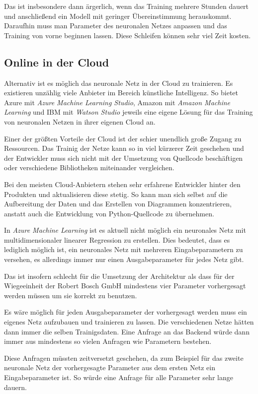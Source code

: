 Das ist insbesondere dann ärgerlich, wenn das Training mehrere Stunden dauert und anschließend ein Modell mit geringer
Übereinstimmung herauskommt. Daraufhin muss man Parameter des neuronalen Netzes anpassen und das Training von vorne
beginnen lassen. Diese Schleifen können sehr viel Zeit kosten.

\subsection{Online in der Cloud}
Alternativ ist es möglich das neuronale Netz in der Cloud zu trainieren. Es existieren unzählig viele Anbieter im
Bereich künstliche Intelligenz. So bietet Azure mit \textit{Azure Machine Learning Studio}, Amazon mit
\textit{Amazon Machine Learning} und IBM mit \textit{Watson Studio} jeweils eine eigene Lösung für das Training von
neuronalen Netzen in ihrer eigenen Cloud an.

Einer der größten Vorteile der Cloud ist der schier unendlich große Zugang zu Ressourcen. Das Trainig der Netze kann so
in viel kürzerer Zeit geschehen und der Entwickler muss sich nicht mit der Umsetzung von Quellcode beschäftigen oder
verschiedene Bibliotheken miteinander vergleichen.

Bei den meisten Cloud-Anbietern stehen sehr erfahrene Entwickler hinter den Produkten und aktualisieren diese stetig. So
kann man sich selbst auf die Aufbereitung der Daten und das Erstellen von Diagrammen konzentrieren, anstatt auch die
Entwicklung von Python-Quellcode zu übernehmen.

In \textit{Azure Machine Learning} ist es aktuell nicht möglich ein neuronales Netz mit multidimensionaler linearer
Regression zu erstellen. Dies bedeutet, dass es lediglich möglich ist, ein neuronales Netz mit mehreren
Eingabeparametern zu versehen, es allerdings immer nur einen Ausgabeparameter für jedes Netz gibt.

Das ist insofern schlecht für die Umsetzung der Architektur als dass für der Wiegeeinheit der Robert Bosch GmbH
mindestens vier Parameter vorhergesagt werden müssen um sie korrekt zu benutzen.

Es wäre möglich für jeden Ausgabeparameter der vorhergesagt werden muss ein eigenes Netz aufzubauen und trainieren zu
lassen. Die verschiedenen Netze hätten dann immer die selben Trainigsdaten. Eine Anfrage an das Backend würde dann immer
aus mindestens so vielen Anfragen wie Parametern bestehen.

Diese Anfragen müssten zeitversetzt geschehen, da zum Beispiel für das zweite neuronale Netz der vorhergesagte Parameter
aus dem ersten Netz ein Eingabeparameter ist. So würde eine Anfrage für alle Parameter sehr lange dauern.

